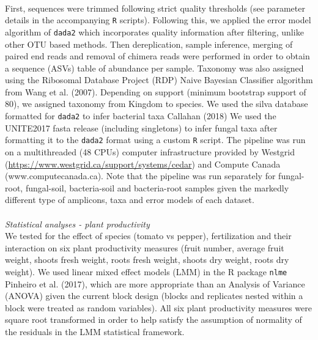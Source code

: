 \documentclass[11pt,]{article}
\begin{document}
\hspace*{0.333em}\\
First, sequences were trimmed following strict quality thresholds (see
parameter details in the accompanying \texttt{R} scripts). Following
this, we applied the error model algorithm of \texttt{dada2} which
incorporates quality information after filtering, unlike other OTU based
methods. Then dereplication, sample inference, merging of paired end
reads and removal of chimera reads were performed in order to obtain a
sequence (ASVs) table of abundance per sample. Taxonomy was also
assigned using the Ribosomal Database Project (RDP) Naive Bayesian
Classifier algorithm from Wang et al. (2007). Depending on support
(minimum bootstrap support of 80), we assigned taxonomy from Kingdom to
species. We used the silva database formatted for \texttt{dada2} to
infer bacterial taxa Callahan (2018) We used the UNITE2017 fasta release
(including singletons) to infer fungal taxa after formatting it to the
\texttt{dada2} format using a custom \texttt{R} script. The pipeline was
run on a multithreaded (48 CPUs) computer infrastructure provided by
Westgrid (\url{https://www.westgrid.ca/support/systems/cedar}) and
Compute Canada (www.computecanada.ca). Note that the pipeline was run
separately for fungal-root, fungal-soil, bacteria-soil and bacteria-root
samples given the markedly different type of amplicons, taxa and error
models of each dataset. ~\\
\hspace*{0.333em}\\
\emph{Statistical analyses - plant productivity}\\
We tested for the effect of species (tomato vs pepper), fertilization
and their interaction on six plant productivity measures (fruit number,
average fruit weight, shoots fresh weight, roots fresh weight, shoots
dry weight, roots dry weight). We used linear mixed effect models (LMM)
in the R package \texttt{nlme} Pinheiro et al. (2017), which are more
appropriate than an Analysis of Variance (ANOVA) given the current block
design (blocks and replicates nested within a block were treated as
random variables). All six plant productivity measures were square root
transformed in order to help satisfy the assumption of normality of the
residuals in the LMM statistical framework.\\
\hspace*{0.333em}\\
\hspace*{0.333em}\\
\end{document}
